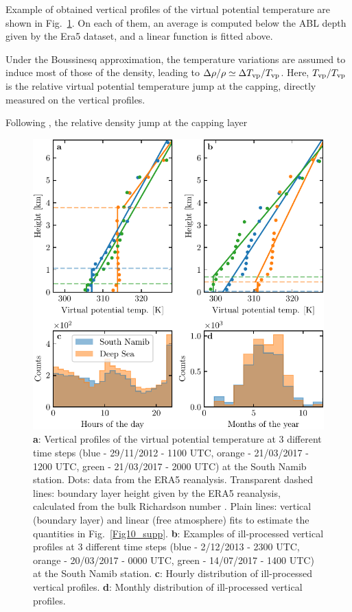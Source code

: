 Example of obtained vertical profiles of the virtual potential temperature are shown in Fig.~\ref{Fig9_supp}. On each of them, an average is computed below the ABL depth given by the Era5 dataset, and a linear function is fitted above.


Under the Boussinesq approximation, the temperature variations are assumed to induce most of those of the density, leading to $\Delta\rho/\rho \simeq \Delta T_{\textup{vp}}/T_{\textup{vp}}$. Here, $T_{\textup{vp}}/T_{\textup{vp}}$ is the relative virtual potential temperature jump at the capping, directly measured on the vertical profiles.

Following \citet{Tritton2012}, the relative density jump at the capping layer


\begin{figure}
  \centering
  \includegraphics[scale=1]{Figures/Figure9_supp.pdf}
  \caption{\textbf{a}: Vertical profiles of the virtual potential temperature at 3 different time steps (blue - 29/11/2012 - 1100 UTC, orange - 21/03/2017 - 1200 UTC, green - 21/03/2017 - 2000 UTC) at the South Namib station. Dots: data from the ERA5 reanalysis. Transparent dashed lines: boundary layer height given by the ERA5 reanalysis, calculated from the bulk Richardson number \citep{seidel2012}. Plain lines: vertical (boundary layer) and linear (free atmosphere) fits to estimate the quantities in Fig.~\ref{Fig10_supp}. \textbf{b}: Examples of ill-processed vertical profiles at 3 different time steps (blue - 2/12/2013 - 2300 UTC, orange - 20/03/2017 - 0000 UTC, green - 14/07/2017 - 1400 UTC) at the South Namib station. \textbf{c}: Hourly distribution of ill-processed vertical profiles. \textbf{d}: Monthly distribution of ill-processed vertical profiles. }
  \label{Fig9_supp}
\end{figure}

